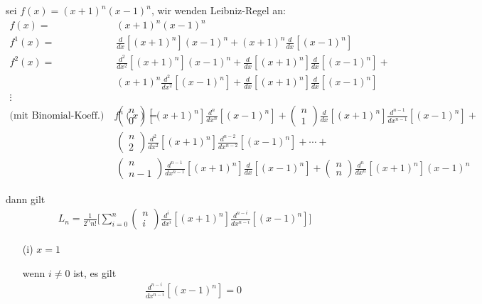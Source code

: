 \begin{enumerate}
sei $f(x)=(x+1)^n(x-1)^n$, wir wenden Leibniz-Regel an:
\begin{align*}
f(x)=&(x+1)^n(x-1)^n \\
f^1(x)=&\frac{d}{dx}[(x+1)^n](x-1)^n+(x+1)^n\frac{d}{dx}[(x-1)^n] \\
f^2(x)=&\frac{d^2}{dx^2}[(x+1)^n](x-1)^n+\frac{d}{dx}[(x+1)^n]\frac{d}{dx}[(x-1)^n]+ \\
& (x+1)^n\frac{d^2}{dx^2}[(x-1)^n]+\frac{d}{dx}[(x+1)^n]\frac{d}{dx}[(x-1)^n] \\
\vdots & \\
\mbox{(mit Binomial-Koeff.)}\hspace{1em}
f^n(x)=&
\begin{pmatrix}
n \\
0
\end{pmatrix}
[(x+1)^n]\frac{d^n}{dx^n}[(x-1)^n]+
\begin{pmatrix}
n \\
1
\end{pmatrix}
\frac{d}{dx}[(x+1)^n]\frac{d^{n-1}}{dx^{n-1}}[(x-1)^n]+ \\
&
\begin{pmatrix}
n \\
2
\end{pmatrix}
\frac{d^2}{dx^2}[(x+1)^n]\frac{d^{n-2}}{dx^{n-2}}[(x-1)^n]+\cdots+ \\
&
\begin{pmatrix}
n \\
n-1
\end{pmatrix}
\frac{d^{n-1}}{dx^{n-1}}[(x+1)^n]\frac{d}{dx}[(x-1)^n]+
\begin{pmatrix}
n \\
n
\end{pmatrix}
\frac{d^n}{dx^n}[(x+1)^n](x-1)^n
\end{align*}

dann gilt
\begin{align*}
L_n=\frac{1}{2^n n!}
\bigg[
\sum_{i=0}^n
\begin{pmatrix}
n \\
i
\end{pmatrix}
\frac{d^i}{dx^i}[(x+1)^n]\frac{d^{n-i}}{dx^{n-i}}[(x-1)^n]
\bigg]
\end{align*}

\newpage

\begin{enumerate}

\item[(i)]$x=1$

wenn $i\neq 0$ ist, es gilt
\begin{align*}
\frac{d^{n-i}}{dx^{n-i}}[(x-1)^n]=0
\end{align*}


\end{enumerate}
\end{enumerate}
